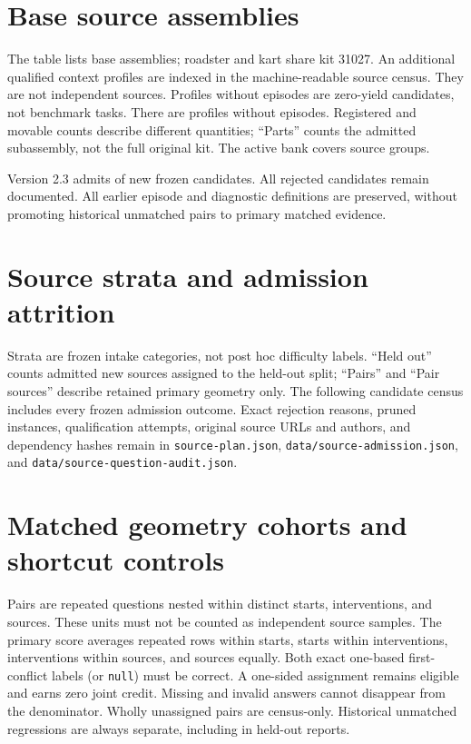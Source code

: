 \section{Base source assemblies}
The table lists \BaseProfileCount{} base assemblies; roadster and kart
share kit 31027. An additional \ContextProfileCount{} qualified context profiles are indexed
in the machine-readable source census. They are not independent sources.
Profiles without episodes are zero-yield candidates, not benchmark tasks.
There are \ZeroYieldProfileCount{} profiles without episodes.
Registered and movable counts describe different quantities; ``Parts''
counts the admitted subassembly, not the full original kit.
The active bank covers \SourceCount{} source groups.
\begingroup\small

\endgroup
\begin{center}\small

\end{center}
Version 2.3 admits \AdmittedCount{} of \CandidateCount{} new frozen
candidates. All \RejectedCount{} rejected candidates remain documented.
All earlier episode and diagnostic definitions are preserved, without
promoting historical unmatched pairs to primary matched evidence.

\section{Source strata and admission attrition}
\begin{center}\small

\end{center}
Strata are frozen intake categories, not post hoc difficulty labels.
``Held out'' counts admitted new sources assigned to the held-out split;
``Pairs'' and ``Pair sources'' describe retained primary geometry only.
The following candidate census includes every frozen admission outcome.
Exact rejection reasons, pruned instances, qualification attempts, original
source URLs and authors, and dependency hashes remain in
\texttt{source-plan.json}, \texttt{data/source-admission.json}, and
\texttt{data/source-question-audit.json}.
\begingroup\small

\endgroup

\section{Matched geometry cohorts and shortcut controls}
\begin{center}\small

\end{center}
Pairs are repeated questions nested within distinct starts, interventions,
and sources. These units must not be counted as independent source samples.
The primary score averages repeated rows within starts, starts within
interventions, interventions within sources, and sources equally.
Both exact one-based first-conflict labels (or \texttt{null}) must be correct.
A one-sided assignment remains eligible and earns zero joint credit.
Missing and invalid answers cannot disappear from the denominator.
Wholly unassigned pairs are census-only. Historical unmatched regressions
are always separate, including in held-out reports.

